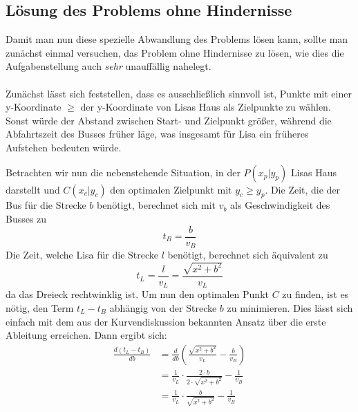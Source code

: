 \documentclass[a4paper, notitlepage, 12pt]{scrartcl}
\begin{document}
 \subsection{Lösung des Problems ohne Hindernisse}
 Damit man nun diese spezielle Abwandlung des Problems lösen kann, sollte man zunächst einmal versuchen, das Problem ohne Hindernisse zu lösen, wie dies die Aufgabenstellung auch \emph{sehr} unauffällig nahelegt. \\ \\
 Zunächst lässt sich feststellen, dass es ausschließlich sinnvoll ist, Punkte mit einer y-Koordinate $\geq$ der y-Koordinate von Lisas Haus als Zielpunkte zu wählen. Sonst würde der Abstand zwischen Start- und Zielpunkt größer, während die Abfahrtszeit des Busses früher läge, was insgesamt für Lisa ein früheres Aufstehen bedeuten würde. \\
\begin{figure}
\end{figure}
 Betrachten wir nun die nebenstehende Situation, in der $P(x_p|y_p)$ Lisas Haus darstellt und $C(x_c|y_c)$ den optimalen Zielpunkt mit $y_c \geq y_p$. Die Zeit, die der Bus für die Strecke $b$ benötigt, berechnet sich mit $v_b$ als Geschwindigkeit des Busses zu
 \begin{equation}
 t_B = \frac{b}{v_B}
 \end{equation}
 Die Zeit, welche Lisa für die Strecke $l$ benötigt, berechnet sich äquivalent zu
 \begin{equation}
 t_L = \frac{l}{v_L} = \frac{\sqrt{x^2 + b^2}}{v_L}
 \end{equation}
 da das Dreieck rechtwinklig ist. Um nun den optimalen Punkt $C$ zu finden, ist es nötig, den Term $t_L - t_B$ abhängig von der Strecke $b$ zu minimieren. Dies lässt sich einfach mit dem aus der Kurvendiskussion bekannten Ansatz über die erste Ableitung erreichen. Dann ergibt sich:
 \begin{equation}
 \begin{split}
 \frac{d (t_L - t_B)}{db} & =  \frac{d}{db} (\frac{\sqrt{x^2 + b^2}}{v_L} - \frac{b}{v_B}) \\
 & = \frac{1}{v_L} \cdot \frac{2 \cdot b}{2 \cdot \sqrt{x^2 + b^2}} - \frac{1}{v_B} \\
 & = \frac{1}{v_L} \cdot \frac{b}{\sqrt{x^2 + b^2}} - \frac{1}{v_B}
 \end{split}
 \end{equation}
\end{document}
